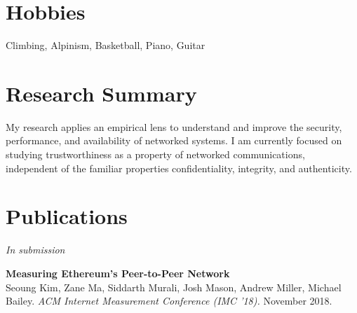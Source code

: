 \documentclass[10pt]{article} %
\begin{document}
{\begin{minipage}[t]{0.44\textwidth}
\begin{tabular}{rl}
\end{tabular}


\section{Hobbies} 

\hspace*{15pt} Climbing, Alpinism, Basketball, Piano, Guitar \\
	
\end{minipage} %
\hfill
\begin{minipage}[t]{0.5\textwidth} %
\vspace{0pt} %
	

\section{Research Summary} 

My research applies an empirical lens to understand and improve the security,
performance, and availability of networked systems. I am currently focused on
studying trustworthiness as a property of networked communications, independent
of the familiar properties confidentiality, integrity, and authenticity. \\

\section{Publications} 

{\raggedleft\textit{In submission}\par}

\textbf{Measuring Ethereum's Peer-to-Peer Network}\\
Seoung Kim, Zane Ma, Siddarth Murali, Josh Mason, Andrew Miller, Michael Bailey.
\textit{ACM Internet Measurement Conference (IMC '18).} November 2018.



\end{minipage}}
\end{document}
